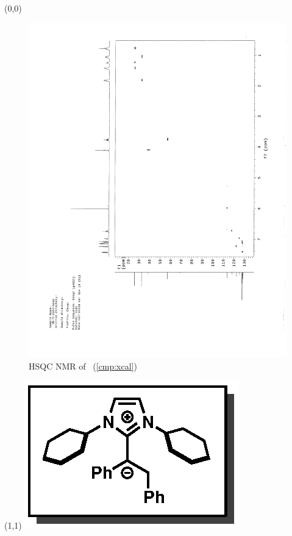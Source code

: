 \clearpage
\begin{textblock}{20}(0,0)
\begin{figure}[htb]
\caption{HSQC NMR of  \CMPxcal\ (\ref{cmp:xcal})}
\includegraphics[scale=0.75, trim = 0mm 0mm 0mm 5mm,
clip]{chp_alkylation/images/nmr/xcalHSQC}
\vspace{-100pt}
\end{figure}
\end{textblock}
\begin{textblock}{1}(1,1)
\includegraphics[scale=0.8, angle=90]{chp_alkylation/images/xcal}
\end{textblock}
\clearpage

